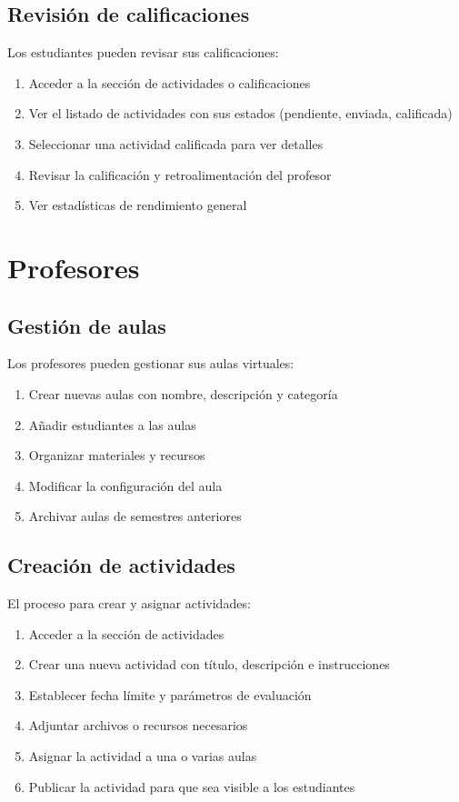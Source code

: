 \documentclass[12pt,a4paper]{report}
\begin{document}
\subsection{Revisión de calificaciones}
Los estudiantes pueden revisar sus calificaciones:

\begin{enumerate}
    \item Acceder a la sección de actividades o calificaciones
    \item Ver el listado de actividades con sus estados (pendiente, enviada, calificada)
    \item Seleccionar una actividad calificada para ver detalles
    \item Revisar la calificación y retroalimentación del profesor
    \item Ver estadísticas de rendimiento general
\end{enumerate}

\section{Profesores}
\subsection{Gestión de aulas}
Los profesores pueden gestionar sus aulas virtuales:

\begin{enumerate}
    \item Crear nuevas aulas con nombre, descripción y categoría
    \item Añadir estudiantes a las aulas
    \item Organizar materiales y recursos
    \item Modificar la configuración del aula
    \item Archivar aulas de semestres anteriores
\end{enumerate}

\subsection{Creación de actividades}
El proceso para crear y asignar actividades:

\begin{enumerate}
    \item Acceder a la sección de actividades
    \item Crear una nueva actividad con título, descripción e instrucciones
    \item Establecer fecha límite y parámetros de evaluación
    \item Adjuntar archivos o recursos necesarios
    \item Asignar la actividad a una o varias aulas
    \item Publicar la actividad para que sea visible a los estudiantes
\end{enumerate}
\end{document}
